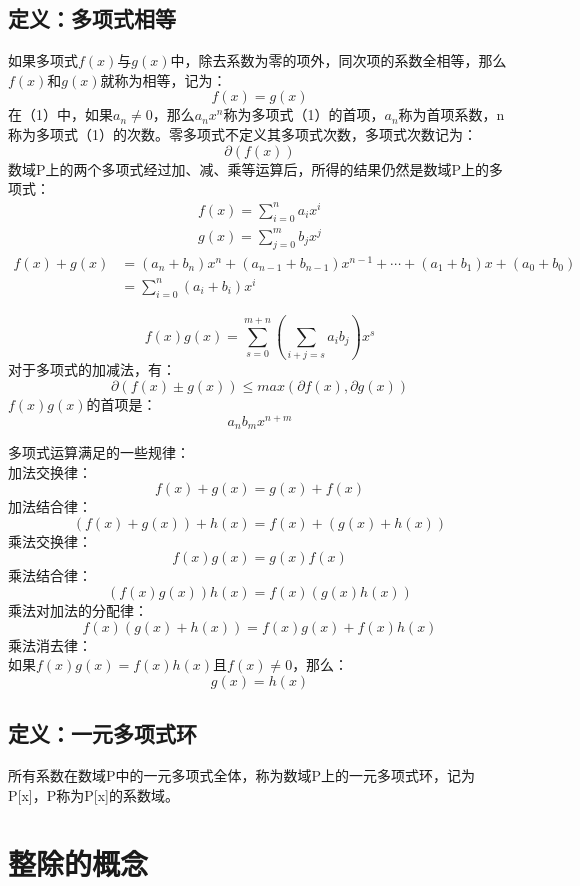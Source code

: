 \documentclass{article}%
\begin{document}
\subsection{定义：多项式相等}
如果多项式$f(x)$与$g(x)$中，除去系数为零的项外，同次项的系数全相等，那么$f(x)$和$g(x)$就称为相等，记为：
\begin{equation*}
	f(x)=g(x)
\end{equation*}
在（1）中，如果$a_n\ne 0$，那么$a_nx^n$称为多项式（1）的首项，$a_n$称为首项系数，n称为多项式（1）的次数。零多项式不定义其多项式次数，多项式次数记为：
\[
\partial(f(x))
\]
数域P上的两个多项式经过加、减、乘等运算后，所得的结果仍然是数域P上的多项式：
\begin{gather*}
	f(x)=\sum_{i=0}^{n}a_ix^i\\
	g(x)=\sum_{j=0}^{m}b_jx^j
\end{gather*}
\begin{equation*}
	\begin{split}
	f(x)+g(x)&=(a_n+b_n)x^n+(a_{n-1}+b_{n-1})x^{n-1}+\cdots+(a_1+b_1)x+(a_0+b_0)\\
	&=\sum_{i=0}^n(a_i+b_i)x^i
	\end{split}
\end{equation*}

\begin{equation*}
		f(x)g(x)=\sum_{s=0}^{m+n}(\sum_{i+j=s}a_ib_j)x^s 
\end{equation*}
对于多项式的加减法，有：
\begin{equation*}
	\partial(f(x)\pm g(x))\le max(\partial f(x),\partial g(x))
\end{equation*}
$f(x)g(x)$的首项是：
\begin{equation*}
	a_nb_mx^{n+m}
\end{equation*}

多项式运算满足的一些规律：
\\
加法交换律：
\[
f(x)+g(x)=g(x)+f(x)
\]
加法结合律：
\[
(f(x)+g(x))+h(x)=f(x)+(g(x)+h(x))
\]
乘法交换律：
\[
f(x)g(x)=g(x)f(x)
\]
乘法结合律：
\[
(f(x)g(x))h(x)=f(x)(g(x)h(x))
\]
乘法对加法的分配律：
\[
f(x)(g(x)+h(x))=f(x)g(x)+f(x)h(x)
\]
乘法消去律：
\\
如果$f(x)g(x)=f(x)h(x)$且$f(x)\ne 0$，那么：
\[
g(x)=h(x)
\]
\subsection{定义：一元多项式环}
所有系数在数域P中的一元多项式全体，称为数域P上的一元多项式环，记为P[x]，P称为P[x]的系数域。

\section{整除的概念}
\end{document}
